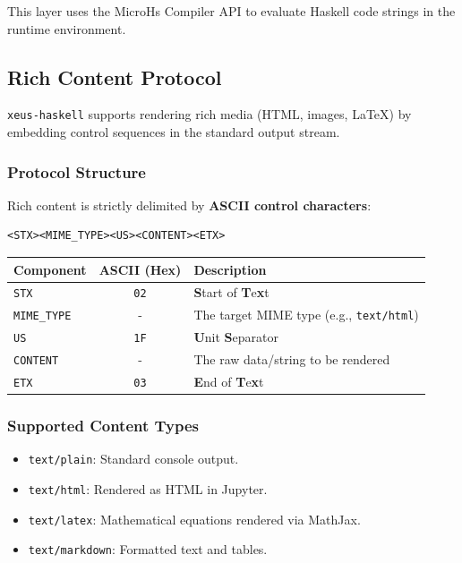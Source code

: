 \documentclass[11pt]{scrartcl}
\begin{document}
This layer uses the MicroHs Compiler API to evaluate Haskell code strings in the runtime environment.
\subsection{Rich Content Protocol}


\texttt{xeus-haskell} supports rendering rich media (HTML, images, LaTeX) by embedding control sequences in the standard output stream.
\subsubsection{Protocol Structure}


Rich content is strictly delimited by \textbf{ASCII control characters}:
\begin{verbatim}
<STX><MIME_TYPE><US><CONTENT><ETX>
\end{verbatim}


\begin{center}
\begin{tabular}{|l|c|p{8cm}|}
\hline
\textbf{Component} & \textbf{ASCII (Hex)} & \textbf{Description} \\
\hline
\texttt{STX} & \texttt{02} & \textbf{S}tart of \textbf{T}e\textbf{x}t \\
\hline
\texttt{MIME\_TYPE} & - & The target MIME type (e.g., \texttt{text/html}) \\
\hline
\texttt{US} & \texttt{1F} & \textbf{U}nit \textbf{S}eparator \\
\hline
\texttt{CONTENT} & - & The raw data/string to be rendered \\
\hline
\texttt{ETX} & \texttt{03} & \textbf{E}nd of \textbf{T}e\textbf{x}t \\
\hline
\end{tabular}
\end{center}
\subsubsection{Supported Content Types}


\begin{itemize}
\item \texttt{text/plain}: Standard console output.
\item \texttt{text/html}: Rendered as HTML in Jupyter.
\item \texttt{text/latex}: Mathematical equations rendered via MathJax.
\item \texttt{text/markdown}: Formatted text and tables.
\end{itemize}
\end{document}
